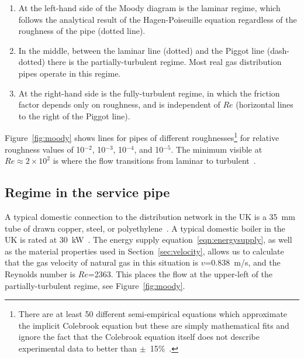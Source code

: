 \documentclass[5p]{elsarticle} %
\begin{document}
\begin{enumerate}
    \item At the left-hand side of the Moody diagram is the laminar regime, which follows the analytical result of the Hagen-Poiseuille equation regardless of the roughness of the pipe (dotted line). 
    \item In the middle, between the laminar line (dotted) and the Piggot line (dash-dotted) there is the partially-turbulent regime. Most real gas distribution pipes operate in this regime.
    \item At the right-hand side is the fully-turbulent regime, in which the friction factor depends only on roughness, and is independent of $Re$ (horizontal lines to the right of the Piggot line).
\end{enumerate}

Figure~\ref{fig:moody} shows lines for pipes of different 
roughnesses\footnote{There are at least 50 different semi-empirical equations which approximate the implicit Colebrook equation but these are simply mathematical fits and ignore the fact that  the Colebrook equation itself does not describe experimental data to better than $\pm$~15\%~\cite{Allen2007, Cerbus2018, She2012}.  
} 
 for relative roughness values of 10$^{-2}$, 10$^{-3}$, 10$^{-4}$, and 10$^{-5}$. 
The minimum visible  at $Re \approx 2\times10^2$  is where the flow transitions from laminar to turbulent~\citep{Allen2007}. 
 

\subsection{Regime in the service pipe}
\label{sec:service}

A typical domestic connection to the distribution network in the UK is a 35~mm tube of drawn copper, steel, or polyethylene~\citep{dodds2013}.
A typical domestic boiler in the UK is rated at 30~kW~\citep{GASTEC2009, Bennett2020}.
The energy supply equation~\eqref{eqn:energysupply}, as well as the material properties used in Section~\ref{sec:velocity}, allows us to calculate that the gas velocity of natural gas in this situation is $v$=0.838~m/s, and the Reynolds number is $Re$=2363.
This places the flow at the upper-left of the partially-turbulent regime, see Figure~\ref{fig:moody}.
\end{document}
